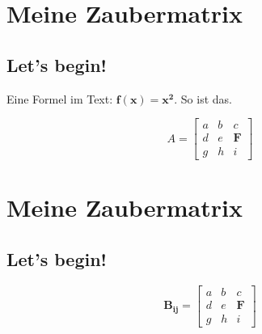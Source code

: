 \documentclass{article}
\begin{document}
\section{Meine Zaubermatrix}
\subsection{Let's begin!}

%
Eine Formel im Text: $\mathbf{f(x) = x^2}$. So ist das.

%

\begin{equation*} A = 
    \begin{bmatrix}
        a & b & c \\
        d & e & \mathbf{F} \\
        g & h & i 
    \end{bmatrix}
\end{equation*}

\section{Meine Zaubermatrix}
\subsection{Let's begin!}
\begin{equation*} \mathbf{B_{ij}} = 
    \begin{bmatrix}
        a & b & c \\
        d & e & \mathbf{F} \\
        g & h & i 
    \end{bmatrix}
\end{equation*}
\end{document}
